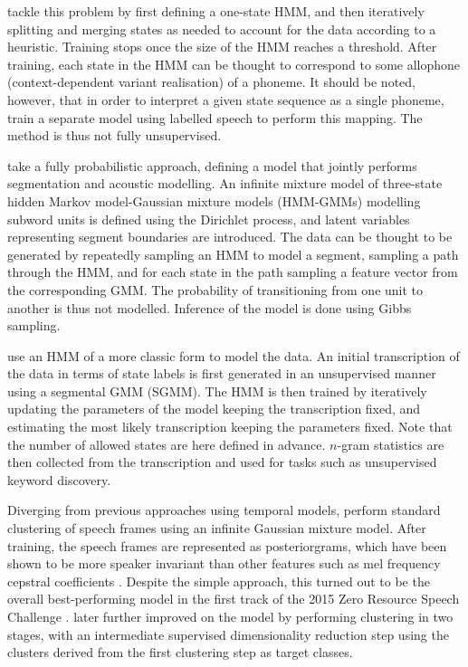 \textcite{varadarajan2008unsupervised} tackle this problem by first defining a one-state HMM, and then iteratively splitting and merging states as needed to account for the data according to a heuristic.
Training stops once the size of the HMM reaches a threshold.
After training, each state in the HMM can be thought to correspond to some allophone (context-dependent variant realisation) of a phoneme.
It should be noted, however, that in order to interpret a given state sequence as a single phoneme, \citeauthor{varadarajan2008unsupervised} train a separate model using labelled speech to perform this mapping.
The method is thus not fully unsupervised.

\textcite{lee2012nonparametric} take a fully probabilistic approach, defining a model that jointly performs segmentation and acoustic modelling.
An infinite mixture model of three-state hidden Markov model-Gaussian mixture models (HMM-GMMs) modelling subword units is defined using the Dirichlet process, and latent variables representing segment boundaries are introduced.
The data can be thought to be generated by repeatedly sampling an HMM to model a segment, sampling a path through the HMM, and for each state in the path sampling a feature vector from the corresponding GMM.
The probability of transitioning from one unit to another is thus not modelled.
Inference of the model is done using Gibbs sampling.

\textcite{siu2014unsupervised} use an HMM of a more classic form to model the data.
An initial transcription of the data in terms of state labels is first generated in an unsupervised manner using a segmental GMM (SGMM).
The HMM is then trained by iteratively updating the parameters of the model keeping the transcription fixed, and estimating the most likely transcription keeping the parameters fixed.
Note that the number of allowed states are here defined in advance.
$n$-gram statistics are then collected from the transcription and used for tasks such as unsupervised keyword discovery.

Diverging from previous approaches using temporal models, \textcite{chen2015parallel} perform standard clustering of speech frames using an infinite Gaussian mixture model.
After training, the speech frames are represented as posteriorgrams, which have been shown to be more speaker invariant than other features such as mel frequency cepstral coefficients \parencite{zhang2010towards}.
Despite the simple approach, this turned out to be the overall best-performing model in the first track of the 2015 Zero Resource Speech Challenge \parencite{versteegh2016zero}.
\textcite{heck2016unsupervised} later further improved on the model by performing clustering in two stages, with an intermediate supervised dimensionality reduction step using the clusters derived from the first clustering step as target classes.

